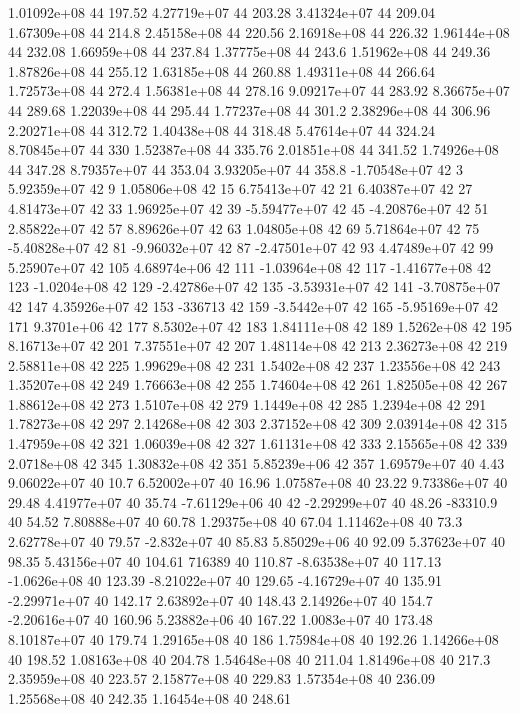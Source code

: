 1.01092e+08 44 197.52
4.27719e+07 44 203.28
3.41324e+07 44 209.04
1.67309e+08 44 214.8
2.45158e+08 44 220.56
2.16918e+08 44 226.32
1.96144e+08 44 232.08
1.66959e+08 44 237.84
1.37775e+08 44 243.6
1.51962e+08 44 249.36
1.87826e+08 44 255.12
1.63185e+08 44 260.88
1.49311e+08 44 266.64
1.72573e+08 44 272.4
1.56381e+08 44 278.16
9.09217e+07 44 283.92
8.36675e+07 44 289.68
1.22039e+08 44 295.44
1.77237e+08 44 301.2
2.38296e+08 44 306.96
2.20271e+08 44 312.72
1.40438e+08 44 318.48
5.47614e+07 44 324.24
8.70845e+07 44 330
1.52387e+08 44 335.76
2.01851e+08 44 341.52
1.74926e+08 44 347.28
8.79357e+07 44 353.04
3.93205e+07 44 358.8
-1.70548e+07 42 3
5.92359e+07 42 9
1.05806e+08 42 15
6.75413e+07 42 21
6.40387e+07 42 27
4.81473e+07 42 33
1.96925e+07 42 39
-5.59477e+07 42 45
-4.20876e+07 42 51
2.85822e+07 42 57
8.89626e+07 42 63
1.04805e+08 42 69
5.71864e+07 42 75
-5.40828e+07 42 81
-9.96032e+07 42 87
-2.47501e+07 42 93
4.47489e+07 42 99
5.25907e+07 42 105
4.68974e+06 42 111
-1.03964e+08 42 117
-1.41677e+08 42 123
-1.0204e+08 42 129
-2.42786e+07 42 135
-3.53931e+07 42 141
-3.70875e+07 42 147
4.35926e+07 42 153
-336713 42 159
-3.5442e+07 42 165
-5.95169e+07 42 171
9.3701e+06 42 177
8.5302e+07 42 183
1.84111e+08 42 189
1.5262e+08 42 195
8.16713e+07 42 201
7.37551e+07 42 207
1.48114e+08 42 213
2.36273e+08 42 219
2.58811e+08 42 225
1.99629e+08 42 231
1.5402e+08 42 237
1.23556e+08 42 243
1.35207e+08 42 249
1.76663e+08 42 255
1.74604e+08 42 261
1.82505e+08 42 267
1.88612e+08 42 273
1.5107e+08 42 279
1.1449e+08 42 285
1.2394e+08 42 291
1.78273e+08 42 297
2.14268e+08 42 303
2.37152e+08 42 309
2.03914e+08 42 315
1.47959e+08 42 321
1.06039e+08 42 327
1.61131e+08 42 333
2.15565e+08 42 339
2.0718e+08 42 345
1.30832e+08 42 351
5.85239e+06 42 357
1.69579e+07 40 4.43
9.06022e+07 40 10.7
6.52002e+07 40 16.96
1.07587e+08 40 23.22
9.73386e+07 40 29.48
4.41977e+07 40 35.74
-7.61129e+06 40 42
-2.29299e+07 40 48.26
-83310.9 40 54.52
7.80888e+07 40 60.78
1.29375e+08 40 67.04
1.11462e+08 40 73.3
2.62778e+07 40 79.57
-2.832e+07 40 85.83
5.85029e+06 40 92.09
5.37623e+07 40 98.35
5.43156e+07 40 104.61
716389 40 110.87
-8.63538e+07 40 117.13
-1.0626e+08 40 123.39
-8.21022e+07 40 129.65
-4.16729e+07 40 135.91
-2.29971e+07 40 142.17
2.63892e+07 40 148.43
2.14926e+07 40 154.7
-2.20616e+07 40 160.96
5.23882e+06 40 167.22
1.0083e+07 40 173.48
8.10187e+07 40 179.74
1.29165e+08 40 186
1.75984e+08 40 192.26
1.14266e+08 40 198.52
1.08163e+08 40 204.78
1.54648e+08 40 211.04
1.81496e+08 40 217.3
2.35959e+08 40 223.57
2.15877e+08 40 229.83
1.57354e+08 40 236.09
1.25568e+08 40 242.35
1.16454e+08 40 248.61
